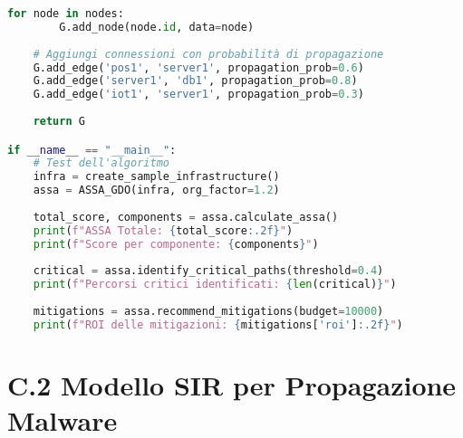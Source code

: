 \begin{lstlisting}[language=Python, caption=Implementazione dell'algoritmo ASSA-GDO]
    for node in nodes:
        G.add_node(node.id, data=node)
    
    # Aggiungi connessioni con probabilità di propagazione
    G.add_edge('pos1', 'server1', propagation_prob=0.6)
    G.add_edge('server1', 'db1', propagation_prob=0.8)
    G.add_edge('iot1', 'server1', propagation_prob=0.3)
    
    return G

if __name__ == "__main__":
    # Test dell'algoritmo
    infra = create_sample_infrastructure()
    assa = ASSA_GDO(infra, org_factor=1.2)
    
    total_score, components = assa.calculate_assa()
    print(f"ASSA Totale: {total_score:.2f}")
    print(f"Score per componente: {components}")
    
    critical = assa.identify_critical_paths(threshold=0.4)
    print(f"Percorsi critici identificati: {len(critical)}")
    
    mitigations = assa.recommend_mitigations(budget=10000)
    print(f"ROI delle mitigazioni: {mitigations['roi']:.2f}")
\end{lstlisting}

\section{\texorpdfstring{\textbf{C.2 Modello SIR per Propagazione Malware}}{C.2 - Modello SIR per Propagazione Malware}}

